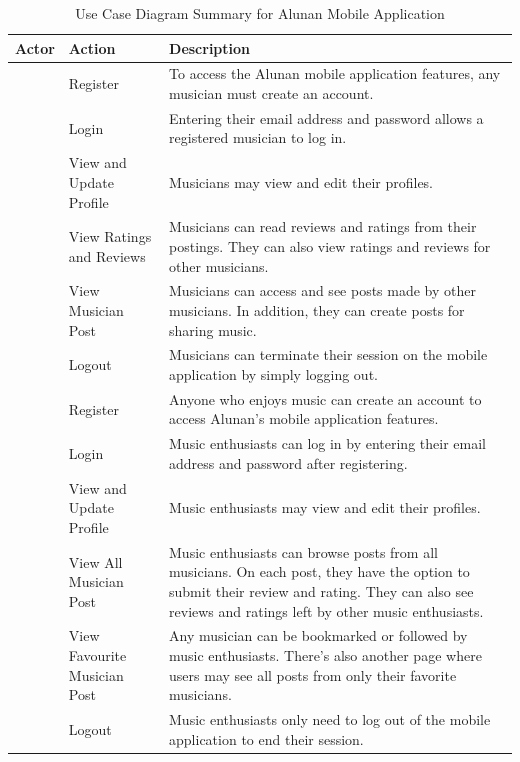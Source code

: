 \begin{table}[ht]
    \centering
    \caption{\centering Use Case Diagram Summary for Alunan Mobile Application}
    \begin{tabular}
        {|>{\raggedright}p{2cm}|>{\raggedright}p{4cm}|>{\raggedright\arraybackslash}p{7cm}|}
    \hline
    \textbf{Actor} & \textbf{Action} & \textbf{Description} \\
    \hline
    \multirow{6}{2cm}{\vspace{-4cm}Musician} & Register & To access the Alunan mobile application features, any musician must create an account. \\
    \cline{2-3}
     & Login & Entering their email address and password allows a registered musician to log in. \\
    \cline{2-3}
     & View and Update Profile & Musicians may view and edit their profiles. \\
    \cline{2-3}
     & View Ratings and Reviews & Musicians can read reviews and ratings from their postings. They can also view ratings and reviews for other musicians. \\
    \cline{2-3}
     & View Musician Post & Musicians can access and see posts made by other musicians. In addition, they can create posts for sharing music. \\
    \cline{2-3}
     & Logout & Musicians can terminate their session on the mobile application by simply logging out. \\
    \hline
    \multirow{6}{2cm}{\vspace{-5cm}Enthusiast} & Register & Anyone who enjoys music can create an account to access Alunan's mobile application features. \\
    \cline{2-3}
     & Login & Music enthusiasts can log in by entering their email address and password after registering. \\
    \cline{2-3}
     & View and Update Profile & Music enthusiasts may view and edit their profiles. \\
    \cline{2-3}
     & View All Musician Post & Music enthusiasts can browse posts from all musicians. On each post, they have the option to submit their review and rating. They can also see reviews and ratings left by other music enthusiasts. \\
    \cline{2-3}
     & View Favourite Musician Post & Any musician can be bookmarked or followed by music enthusiasts. There's also another page where users may see all posts from only their favorite musicians. \\
    \cline{2-3}
     & Logout & Music enthusiasts only need to log out of the mobile application to end their session. \\
    \hline
    \end{tabular}
\end{table}
\pagebreak

